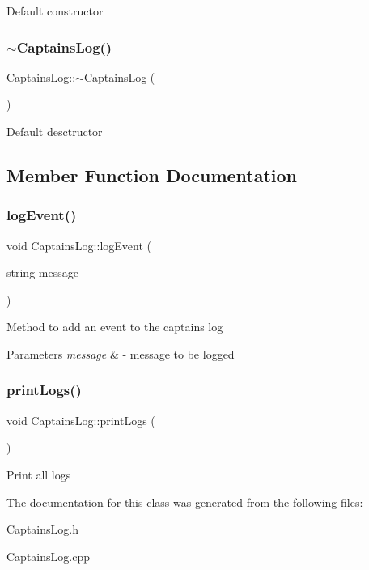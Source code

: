 Default constructor \mbox{\label{classCaptainsLog_ad226cf893a8e2498d164be4f6f097231}} 
\subsubsection{\texorpdfstring{$\sim$\+Captains\+Log()}{~CaptainsLog()}}
{\footnotesize\ttfamily Captains\+Log\+::$\sim$\+Captains\+Log (\begin{DoxyParamCaption}{ }\end{DoxyParamCaption})}

Default desctructor 

\subsection{Member Function Documentation}
\mbox{\label{classCaptainsLog_a59214274a2c25268a26e2af84fe50bc0}} 
\subsubsection{\texorpdfstring{log\+Event()}{logEvent()}}
{\footnotesize\ttfamily void Captains\+Log\+::log\+Event (\begin{DoxyParamCaption}\item[{string}]{message }\end{DoxyParamCaption})}

Method to add an event to the captains log 
\begin{DoxyParams}{Parameters}
{\em message} & -\/ message to be logged \\
\hline
\end{DoxyParams}
\mbox{\label{classCaptainsLog_a7a534bb9e892210686b76c15b30fab95}} 
\subsubsection{\texorpdfstring{print\+Logs()}{printLogs()}}
{\footnotesize\ttfamily void Captains\+Log\+::print\+Logs (\begin{DoxyParamCaption}{ }\end{DoxyParamCaption})}

Print all logs 

The documentation for this class was generated from the following files\+:\begin{DoxyCompactItemize}
\item 
Captains\+Log.\+h\item 
Captains\+Log.\+cpp\end{DoxyCompactItemize}
